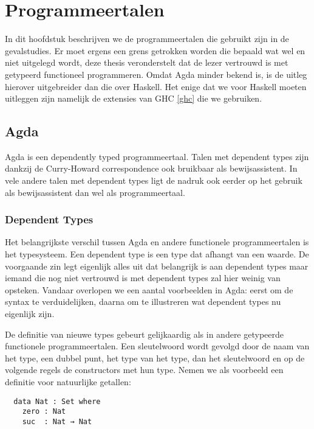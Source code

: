 \chapter{Programmeertalen}
\label{ch:agda-haskell}

In dit hoofdstuk beschrijven we de programmeertalen die gebruikt zijn in de
gevalstudies. Er moet ergens een grens getrokken worden die bepaald wat wel en
niet uitgelegd wordt, deze thesis veronderstelt dat de lezer vertrouwd is met
getypeerd functioneel programmeren.
Omdat Agda minder bekend is, is de uitleg hierover uitgebreider dan die over
Haskell. Het enige dat we voor Haskell moeten uitleggen zijn namelijk de
extensies van GHC \ref{ghc} die we gebruiken.


\section{Agda}

Agda is een dependently typed programmeertaal. Talen met dependent types zijn
dankzij de Curry-Howard correspondence ook bruikbaar als bewijsassistent. In
vele andere talen met dependent types ligt de nadruk ook eerder op het gebruik
als bewijsassistent dan wel als programmeertaal.

\subsection{Dependent Types}

Het belangrijkste verschil tussen Agda en andere functionele programmeertalen
is het typesysteem. Een dependent type is een type dat afhangt van een waarde.
De voorgaande zin legt eigenlijk alles uit dat belangrijk is aan dependent
types maar iemand die nog niet vertrouwd is met dependent types zal hier weinig
van opsteken. Vandaar overlopen we een aantal voorbeelden in Agda: eerst om de
syntax te verduidelijken, daarna om te illustreren wat dependent types nu
eigenlijk zijn.

De definitie van nieuwe types gebeurt gelijkaardig als in andere getypeerde
functionele programmeertalen. Een  sleutelwoord wordt gevolgd door
de naam van het type, een dubbel punt, het type van het type, dan het
sleutelwoord  en op de volgende regels de constructors met hun
type. Nemen we als voorbeeld een definitie voor natuurlijke getallen:

\begin{verbatim}
  data Nat : Set where
    zero : Nat
    suc  : Nat → Nat
\end{verbatim}

